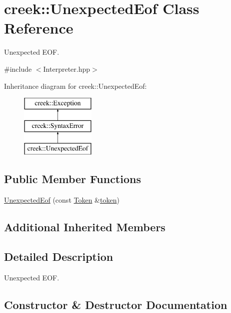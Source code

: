 \hypertarget{classcreek_1_1_unexpected_eof}{}\section{creek\+:\+:Unexpected\+Eof Class Reference}
\label{classcreek_1_1_unexpected_eof}


Unexpected E\+OF.  




{\ttfamily \#include $<$Interpreter.\+hpp$>$}

Inheritance diagram for creek\+:\+:Unexpected\+Eof\+:\begin{figure}[H]
\begin{center}
\leavevmode
\includegraphics[height=3.000000cm]{classcreek_1_1_unexpected_eof}
\end{center}
\end{figure}
\subsection*{Public Member Functions}
\begin{DoxyCompactItemize}
\item 
\hyperlink{classcreek_1_1_unexpected_eof_ac71bcd1a45e7edb01732cdb1ff58c21e}{Unexpected\+Eof} (const \hyperlink{classcreek_1_1_token}{Token} \&\hyperlink{classcreek_1_1_syntax_error_a5d8f72f338fd320cb76f9e1a875e2a35}{token})
\end{DoxyCompactItemize}
\subsection*{Additional Inherited Members}


\subsection{Detailed Description}
Unexpected E\+OF. 

\subsection{Constructor \& Destructor Documentation}
